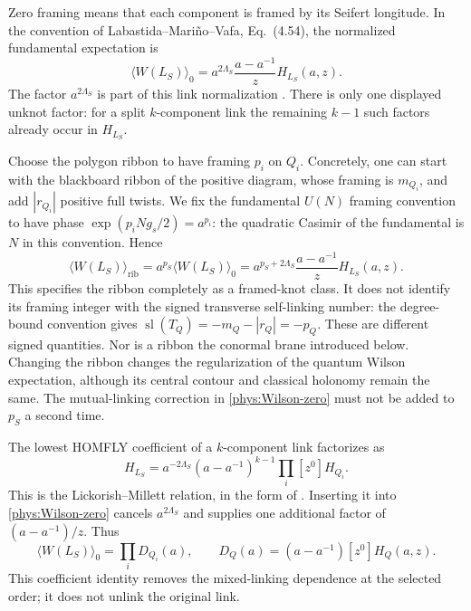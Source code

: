 \documentclass[11pt,letterpaper]{article}
\numberwithin{equation}{section}
\theoremstyle{definition}
\theoremstyle{remark}
\begin{document}
Zero framing means that each component is framed by its Seifert
longitude. In the convention of Labastida--Mari\~no--Vafa,
Eq.~(4.54), the normalized fundamental expectation is
\begin{equation}
 \langle W(L_S)\rangle_0
 =a^{2\Lambda_S}\frac{a-a^{-1}}{z}H_{L_S}(a,z).
 \label{phys:Wilson-zero}
\end{equation}
The factor $a^{2\Lambda_S}$ is part of this link normalization
\cite{LMV}. There is only one displayed unknot factor: for a split
$k$-component link the remaining $k-1$ such factors already occur in
$H_{L_S}$.

Choose the polygon ribbon to have framing $p_i$ on $Q_i$. Concretely,
one can start with the blackboard ribbon of the positive diagram, whose
framing is $m_{Q_i}$, and add $|r_{Q_i}|$ positive full twists. We fix
the fundamental $U(N)$ framing convention to have phase
$\exp(p_i N g_s/2)=a^{p_i}$: the quadratic Casimir of the fundamental
is $N$ in this convention. Hence
\begin{equation}
 \langle W(L_S)\rangle_{\mathrm{rib}}
 =a^{p_S}\langle W(L_S)\rangle_0
 =a^{p_S+2\Lambda_S}\frac{a-a^{-1}}{z}H_{L_S}(a,z).
 \label{phys:Wilson-ribbon}
\end{equation}
This specifies the ribbon completely as a framed-knot class. It does
not identify its framing integer with the signed transverse
self-linking number: the degree-bound convention gives
$\operatorname{sl}(T_Q)=-m_Q-|r_Q|=-p_Q$. These are different signed
quantities. Nor is a ribbon the conormal brane introduced below.
Changing the ribbon changes the regularization of the quantum Wilson
expectation, although its central contour and classical holonomy remain
the same. The mutual-linking correction in
\eqref{phys:Wilson-zero} must not be added to $p_S$ a second time.

The lowest HOMFLY coefficient of a $k$-component link factorizes as
\begin{equation}
 [z^{1-k}]H_{L_S}
 =a^{-2\Lambda_S}(a-a^{-1})^{k-1}
   \prod_i [z^0]H_{Q_i}.
 \label{phys:lowest-H}
\end{equation}
This is the Lickorish--Millett relation, in the form of
\cite[Eq.~(4.64)]{LMV}. Inserting it into
\eqref{phys:Wilson-zero} cancels $a^{2\Lambda_S}$ and supplies one
additional factor of $(a-a^{-1})/z$. Thus
\begin{equation}
 [z^{-k}]\langle W(L_S)\rangle_0
 =\prod_i D_{Q_i}(a),\qquad
 D_Q(a)=(a-a^{-1})[z^0]H_Q(a,z).
 \label{phys:disk-factorization}
\end{equation}
This coefficient identity removes the mixed-linking dependence at the
selected order; it does not unlink the original link.
\end{document}
